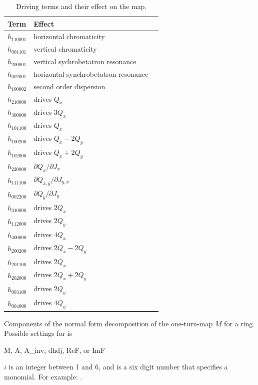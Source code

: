 \begin{description}
{\begin{table}[htb]
\centering
\begin{tabular}{lll}
  \toprule
  Term  & Effect \\
  \midrule
  $h_{110001}$  &  horizontal chromaticity \\
  $h_{001101}$  &  vertical chromaticity   \\
  $h_{200001}$  &  vertical sychrobetatron resonance    \\
  $h_{002001}$  &  horizontal synchrobetatron resonance \\
  $h_{100002}$  &  second order dispersion \\
  $h_{210000}$  &  drives $Q_x$            \\
  $h_{300000}$  &  drives $3Q_x$           \\
  $h_{101100}$  &  drives $Q_x$            \\
  $h_{100200}$  &  drives $Q_x-2Q_y$       \\
  $h_{102000}$  &  drives $Q_x+2Q_y$       \\
  $h_{220000}$  &  $\partial Q_x/\partial J_x$ \\
  $h_{111100}$  &  $\partial Q_{x,y}/\partial J_{y,x}$ \\
  $h_{002200}$  &  $\partial Q_y/\partial J_y$ \\
  $h_{310000}$  &  drives $2Q_x$  \\
  $h_{112000}$  &  drives $2Q_y$  \\
  $h_{400000}$  &  drives $4Q_x$  \\
  $h_{200200}$  &  drives $2Q_x-2Q_y$ \\
  $h_{201100}$  &  drives $2Q_x$ \\
  $h_{202000}$  &  drives $2Q_x+2Q_y$ \\
  $h_{003100}$  &  drives $2Q_y$ \\
  $h_{004000}$  &  drives $4Q_y$ \\
  \bottomrule
\end{tabular}
\caption[Common Driving Terms.]
{Driving terms and their effect on the map.}
\label{t:dts}
\end{table}

  \item[normal.<type>.$i$.<monomial>] \Newline {}
Components of the normal form decomposition of the one-turn-map $M$ for a ring. 
Possible settings for  is
\begin{example}
  M, A, A_inv, dhdj, ReF, or ImF
\end{example}      
$i$ is an integer between 1 and 6, and  is a six digit number that specifies
a monomial. For example: . 

}
\end{description}
